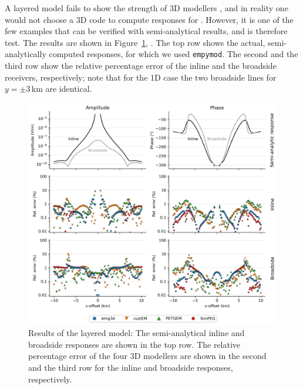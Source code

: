 \documentclass[extra, camera,%
]{gji}
\newcommand{\empymod}{\texttt{empymod}\xspace}
\begin{document}
A layered model fails to show the strength of 3D modellers , and in reality one would not choose a 3D code to compute responses for . However, it is one of the few examples that can be verified with semi-analytical results, and  is therefore  test. The results are shown in Figure~\ref{fig:results-layered}, . The top row shows the actual, semi-analytically computed responses, for which we used \empymod\citep{GEO.17.Werthmuller}. The second and the third row show the relative percentage error of the inline and the broadside receivers, respectively; note that for the 1D case the  two broadside lines for $y=\pm3\,$km are identical.
%
\begin{figure}
  \centering
  \includegraphics[width=.9\linewidth]{figures/results-layered.png}
  \caption{Results of the layered model: The semi-analytical inline and broadside responses are shown in the top row. The relative percentage error of the four 3D modellers are shown in the second and the third row for the inline and broadside responses, respectively.}
  \label{fig:results-layered}
\end{figure}
%
\end{document}
